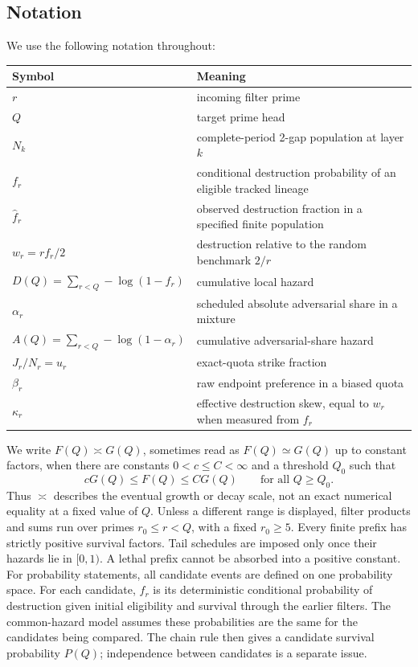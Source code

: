 \subsection{Notation}
We use the following notation throughout:
\begin{longtable}{ll}
\toprule
Symbol & Meaning \\
\midrule
$r$ & incoming filter prime \\
$Q$ & target prime head \\
$N_k$ & complete-period 2-gap population at layer $k$ \\
$f_r$ & conditional destruction probability of an eligible tracked lineage \\
$\widehat f_r$ & observed destruction fraction in a specified finite population \\
$w_r=rf_r/2$ & destruction relative to the random benchmark $2/r$ \\
$D(Q)=\sum_{r < Q}-\log(1-f_r)$ & cumulative local hazard \\
$\alpha_r$ & scheduled absolute adversarial share in a mixture \\
$A(Q)=\sum_{r < Q}-\log(1-\alpha_r)$ & cumulative adversarial-share hazard \\
$J_r/N_r=u_r$ & exact-quota strike fraction \\
$\beta_r$ & raw endpoint preference in a biased quota \\
$\kappa_r$ & effective destruction skew, equal to $w_r$ when measured from $f_r$ \\
\bottomrule
\end{longtable}
We write $F(Q)\asymp G(Q)$, sometimes read as $F(Q)\simeq G(Q)$ up to
constant factors, when there are constants $0<c\le C<\infty$ and a
threshold $Q_0$ such that
\begin{equation*}
cG(Q)\le F(Q)\le CG(Q)
\qquad\text{for all }Q\ge Q_0.
\end{equation*}
Thus $\asymp$ describes the eventual growth or decay scale, not an exact
numerical equality at a fixed value of $Q$.
Unless a different range is displayed, filter products and sums run over primes $r_0\le r < Q$, with a fixed $r_0\ge5$. Every finite prefix has strictly positive survival factors. Tail schedules are imposed only once their hazards lie in $[0,1)$. A lethal prefix cannot be absorbed into a positive constant.
For probability statements, all candidate events are defined on one probability space. For each candidate, $f_r$ is its deterministic conditional probability of destruction given initial eligibility and survival through the earlier filters. The common-hazard model assumes these probabilities are the same for the candidates being compared. The chain rule then gives a candidate survival probability $P(Q)$; independence between candidates is a separate issue.
